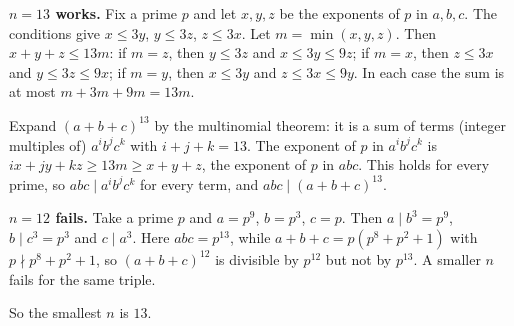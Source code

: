 \textbf{$n=13$ works.} Fix a prime $p$ and let $x,y,z$ be the exponents of $p$ in $a,b,c$. The conditions give $x\le3y$, $y\le3z$, $z\le3x$. Let $m=\min(x,y,z)$. Then $x+y+z\le13m$: if $m=z$, then $y\le3z$ and $x\le3y\le9z$; if $m=x$, then $z\le3x$ and $y\le3z\le9x$; if $m=y$, then $x\le3y$ and $z\le3x\le9y$. In each case the sum is at most $m+3m+9m=13m$.

Expand $(a+b+c)^{13}$ by the multinomial theorem: it is a sum of terms (integer multiples of) $a^ib^jc^k$ with $i+j+k=13$. The exponent of $p$ in $a^ib^jc^k$ is $ix+jy+kz\ge13m\ge x+y+z$, the exponent of $p$ in $abc$. This holds for every prime, so $abc\mid a^ib^jc^k$ for every term, and $abc\mid(a+b+c)^{13}$.

\textbf{$n=12$ fails.} Take a prime $p$ and $a=p^9$, $b=p^3$, $c=p$. Then $a\mid b^3=p^9$, $b\mid c^3=p^3$ and $c\mid a^3$. Here $abc=p^{13}$, while $a+b+c=p(p^8+p^2+1)$ with $p\nmid p^8+p^2+1$, so $(a+b+c)^{12}$ is divisible by $p^{12}$ but not by $p^{13}$. A smaller $n$ fails for the same triple.

So the smallest $n$ is $\boxed{13}$.
